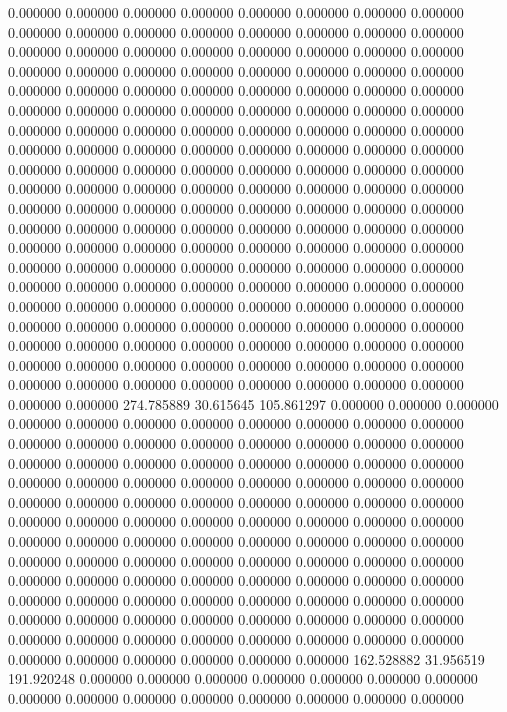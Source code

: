 0.000000 0.000000 0.000000
0.000000 0.000000 0.000000
0.000000 0.000000 0.000000
0.000000 0.000000 0.000000
0.000000 0.000000 0.000000
0.000000 0.000000 0.000000
0.000000 0.000000 0.000000
0.000000 0.000000 0.000000
0.000000 0.000000 0.000000
0.000000 0.000000 0.000000
0.000000 0.000000 0.000000
0.000000 0.000000 0.000000
0.000000 0.000000 0.000000
0.000000 0.000000 0.000000
0.000000 0.000000 0.000000
0.000000 0.000000 0.000000
0.000000 0.000000 0.000000
0.000000 0.000000 0.000000
0.000000 0.000000 0.000000
0.000000 0.000000 0.000000
0.000000 0.000000 0.000000
0.000000 0.000000 0.000000
0.000000 0.000000 0.000000
0.000000 0.000000 0.000000
0.000000 0.000000 0.000000
0.000000 0.000000 0.000000
0.000000 0.000000 0.000000
0.000000 0.000000 0.000000
0.000000 0.000000 0.000000
0.000000 0.000000 0.000000
0.000000 0.000000 0.000000
0.000000 0.000000 0.000000
0.000000 0.000000 0.000000
0.000000 0.000000 0.000000
0.000000 0.000000 0.000000
0.000000 0.000000 0.000000
0.000000 0.000000 0.000000
0.000000 0.000000 0.000000
0.000000 0.000000 0.000000
0.000000 0.000000 0.000000
0.000000 0.000000 0.000000
0.000000 0.000000 0.000000
0.000000 0.000000 0.000000
0.000000 0.000000 0.000000
0.000000 0.000000 0.000000
0.000000 0.000000 0.000000
0.000000 0.000000 0.000000
0.000000 0.000000 0.000000
0.000000 0.000000 0.000000
0.000000 0.000000 0.000000
0.000000 0.000000 0.000000
0.000000 0.000000 0.000000
0.000000 0.000000 0.000000
0.000000 0.000000 0.000000
274.785889 30.615645 105.861297
0.000000 0.000000 0.000000
0.000000 0.000000 0.000000
0.000000 0.000000 0.000000
0.000000 0.000000 0.000000
0.000000 0.000000 0.000000
0.000000 0.000000 0.000000
0.000000 0.000000 0.000000
0.000000 0.000000 0.000000
0.000000 0.000000 0.000000
0.000000 0.000000 0.000000
0.000000 0.000000 0.000000
0.000000 0.000000 0.000000
0.000000 0.000000 0.000000
0.000000 0.000000 0.000000
0.000000 0.000000 0.000000
0.000000 0.000000 0.000000
0.000000 0.000000 0.000000
0.000000 0.000000 0.000000
0.000000 0.000000 0.000000
0.000000 0.000000 0.000000
0.000000 0.000000 0.000000
0.000000 0.000000 0.000000
0.000000 0.000000 0.000000
0.000000 0.000000 0.000000
0.000000 0.000000 0.000000
0.000000 0.000000 0.000000
0.000000 0.000000 0.000000
0.000000 0.000000 0.000000
0.000000 0.000000 0.000000
0.000000 0.000000 0.000000
0.000000 0.000000 0.000000
0.000000 0.000000 0.000000
0.000000 0.000000 0.000000
0.000000 0.000000 0.000000
0.000000 0.000000 0.000000
162.528882 31.956519 191.920248
0.000000 0.000000 0.000000
0.000000 0.000000 0.000000
0.000000 0.000000 0.000000
0.000000 0.000000 0.000000
0.000000 0.000000 0.000000
